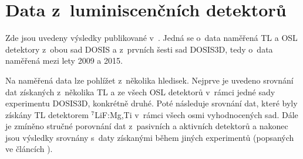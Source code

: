 \section{Data z~luminiscenčních detektorů}\label{sec:dosis_vysledky}
Zde jsou uvedeny výsledky publikované v~\cite{dosis}. Jedná se o~data naměřená TL a OSL detektory z~obou sad DOSIS a z~prvních šesti sad DOSIS3D, tedy o~data naměřená mezi lety 2009 a 2015. %

Na naměřená data lze pohlížet z~několika hledisek. Nejprve je uvedeno srovnání dat získaných z~několika TL a ze všech OSL detektorů v~rámci jedné sady experimentu DOSIS3D, konkrétně druhé. Poté následuje srovnání dat, které byly získány TL detektorem $^7$LiF:Mg,Ti v~rámci všech osmi vyhodnocených sad. Dále je zmíněno stručné porovnání dat z~pasivních a aktivních detektorů a nakonec jsou výsledky srovnány s~daty získanými během jiných experimentů (popsaných ve článcích \cite{japonsky,passDetectors, ambrozova_dvaExperimenty, pille, pille2}).
